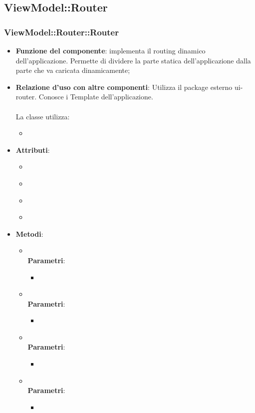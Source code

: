 \subsection{ViewModel::Router}
\subsubsection{ViewModel::Router::Router}
\begin{itemize}
\item\textbf{Funzione del componente}: implementa il routing dinamico dell'applicazione. Permette di dividere la parte statica dell'applicazione dalla parte che va caricata dinamicamente;
	\item\textbf{Relazione d'uso con altre componenti}: Utilizza il package esterno ui-router. Conosce i Template dell'applicazione.\\ \\
La classe utilizza:
	\begin{itemize}
		\item
	\end{itemize}
\item\textbf{Attributi}:
	\begin{itemize}
		\item\code{}\\
		\item\code{}\\
		\item\code{}\\
		\item\code{}\\
	\end{itemize}
\item\textbf{Metodi}:
	\begin{itemize}
		\item\code{}\\
		\textbf{Parametri}:
			\begin{itemize}
				\item\code{}\\
			\end{itemize}
		\item\code{}\\
		\textbf{Parametri}:
			\begin{itemize}
				\item\code{}\\
			\end{itemize}
		\item\code{}\\
		\textbf{Parametri}:
			\begin{itemize}
				\item\code{}\\
			\end{itemize}
		\item\code{}\\
		\textbf{Parametri}:
			\begin{itemize}
				\item\code{}\\
			\end{itemize}
	\end{itemize}
\end{itemize}